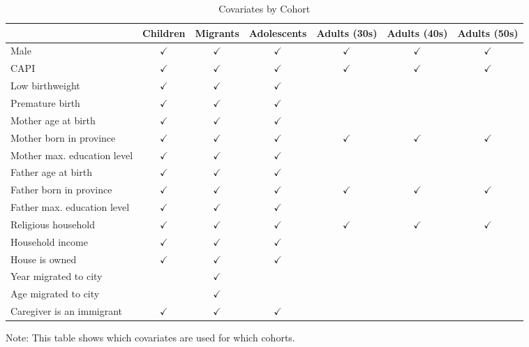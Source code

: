 \documentclass{article}
\begin{document}
\begin{table}
	\caption{Covariates by Cohort} \label{covariates}
	\begin{center}
		\begin{tabular}{l cccccc}
		\toprule
		& Children & Migrants & Adolescents & Adults (30s) & Adults (40s) & Adults (50s) \\
		\midrule
		Male & $\checkmark$ & $\checkmark$ & $\checkmark$ & $\checkmark$ & $\checkmark$ & $\checkmark$  \\
		CAPI & $\checkmark$ & $\checkmark$ & $\checkmark$ & $\checkmark$ & $\checkmark$ & $\checkmark$  \\
		Low birthweight & $\checkmark$ & $\checkmark$ & $\checkmark$ &  &  &  \\
		Premature birth & $\checkmark$ & $\checkmark$ & $\checkmark$ &  &  &  \\
		Mother age at birth & $\checkmark$ & $\checkmark$ & $\checkmark$ &  &  &  \\
		Mother born in province & $\checkmark$ & $\checkmark$ & $\checkmark$ & $\checkmark$ & $\checkmark$ & $\checkmark$  \\
		Mother max. education level & $\checkmark$ & $\checkmark$ & $\checkmark$ &  &  &  \\
		Father age at birth & $\checkmark$ & $\checkmark$ & $\checkmark$ &  &  &  \\
		Father born in province & $\checkmark$ & $\checkmark$ & $\checkmark$ & $\checkmark$ & $\checkmark$ & $\checkmark$  \\
		Father max. education level & $\checkmark$ & $\checkmark$ & $\checkmark$ &  &  &  \\
		Religious household & $\checkmark$ & $\checkmark$ & $\checkmark$ & $\checkmark$ & $\checkmark$ & $\checkmark$  \\
		Household income & $\checkmark$ & $\checkmark$ & $\checkmark$ &  &  &  \\
		House is owned & $\checkmark$ & $\checkmark$ & $\checkmark$ &  &  &  \\
		Year migrated to city &  & $\checkmark$ & &  &  &  \\
		Age migrated to city & & $\checkmark$ & & & & \\
		Caregiver is an immigrant & $\checkmark$ & $\checkmark$ & $\checkmark$ & & & \\
		\bottomrule
		\end{tabular}
	\end{center}
\raggedright
\footnotesize
Note: This table shows which covariates are used for which cohorts.
\end{table}
\end{document}
